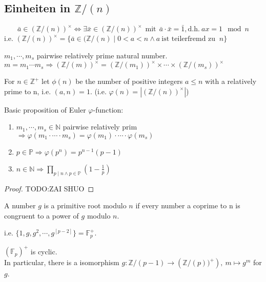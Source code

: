 \subsection{Einheiten in $\mathbb{Z}/(n)$}
\[\bar{a}\in \left(\mathbb{Z}/(n)\right)^\times\Leftrightarrow\exists \bar{x} \in \left(\mathbb{Z}/(n)\right)^\times\ \ \text{mit}\ \ \bar{a}\cdot\bar{x} = \bar{1},\text{d.h.}\ ax=1 \mod n\]
i.e. \(\left(\mathbb{Z}/(n)\right)^\times = \{\bar{a}\in (\mathbb{Z}/(n)\mid 0 < a < n \wedge a \ \text{ist teilerfremd zu }\ n\}\)
\begin{remark}
    \(m_1,\cdots,m_s\) pairwise relatively prime natural number. \(m = m_1\cdots m_s \Rightarrow\left(\mathbb{Z}/(m)\right)^\times=\left(\mathbb{Z}/(m_1)\right)^\times \times\cdots\times\left(\mathbb{Z}/(m_s)\right)^\times\)
\end{remark}

\begin{definition}
    For \(n\in\mathbb{Z}^+\) let \(\phi(n)\) be the number of positive integers \(a\leq n\) with a relatively prime to n, i.e. \((a,n)=1\). (i.e. \(\varphi(n) = \left|\left(\mathbb{Z}/(n)\right)^\times \right|\))
\end{definition}
\begin{proposition}
    Basic proposition of Euler $\varphi$-function:
    \begin{enumerate}
        \item \(m_1,\cdots,m_s\in \mathbb{N}\) pairwise relatively prim \(\Rightarrow \varphi(m_1\cdot \cdots \cdot m_s) = \varphi(m_1)\cdot \cdots \cdot \varphi(m_s)\)
        \item \(p\in\mathbb{P}\Rightarrow \varphi(p^n)=p^{n-1}(p-1)\)
        \item \(n\in\mathbb{N}\Rightarrow \prod_{p\mid n \wedge p\in\mathbb{P}}(1-\frac{1}{p})\)
    \end{enumerate}
\end{proposition}

\begin{proof}
    TODO:ZAI SHUO
\end{proof}


\begin{definition}
    A number $g$ is a primitive root modulo $n$ if every number a coprime to n is congruent to a power of $g$ modulo $n$.
\end{definition}
\begin{remark}
    i.e. \(\{1,g,g^2,\cdots,g^[p-2]\}= \mathbb{F}_p^+\).
\end{remark}

\begin{theorem}
    \(\left(\mathbb{F}_p\right)^+\) is cyclic.\\
     In particular, there is a isomorphism $g:\mathbb{Z}/(p-1)\to\left(\mathbb{Z}/(p))^+\right),\ m\mapsto g^m$ for \(g\).
\end{theorem}